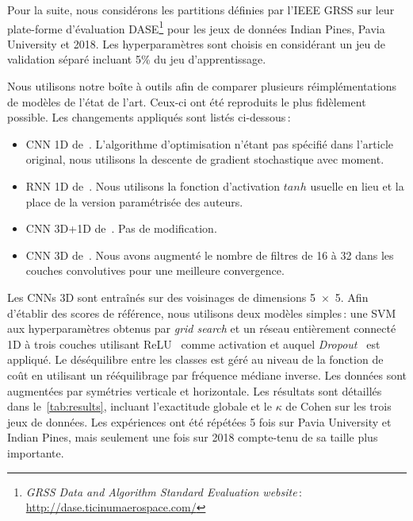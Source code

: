 Pour la suite, nous considérons les partitions définies par l'\gls{IEEE} \gls{GRSS} sur leur plate-forme d'évaluation DASE\footnote{\emph{GRSS Data and Algorithm Standard Evaluation website}\,: \url{http://dase.ticinumaerospace.com/}} pour les jeux de données Indian Pines, Pavia University et  2018. Les hyperparamètres sont choisis en considérant un jeu de validation séparé incluant 5\% du jeu d'apprentissage.

Nous utilisons notre boîte à outils afin de comparer plusieurs réimplémentations de modèles de l'état de l'art. Ceux-ci ont été reproduits le plus fidèlement possible. Les changements appliqués sont listés ci-dessous\,:
\begin{itemize}
	\item \gls{CNN} 1D de~\citet{hu_deep_2015}. L'algorithme d'optimisation n'étant pas spécifié dans l'article original, nous utilisons la descente de gradient stochastique avec moment.
    \item \gls{RNN} 1D de~\citet{mou_deep_2017}. Nous utilisons la fonction d'activation $tanh$ usuelle en lieu et la place de la version paramétrisée des auteurs.
    \item \gls{CNN} 3D+1D de~\citet{ben_hamida_deep_2016}. Pas de modification.
    \item \gls{CNN} 3D de~\citet{li_spectralspatial_2017}. Nous avons augmenté le nombre de filtres de 16 à 32 dans les couches convolutives pour une meilleure convergence.
\end{itemize}

Les \glspl{CNN} 3D sont entraînés sur des voisinages de dimensions \num{5x5}. Afin d'établir des scores de référence, nous utilisons deux modèles simples\,: une \gls{SVM} aux hyperparamètres obtenus par \emph{grid search} et un réseau entièrement connecté 1D à trois couches utilisant \gls{ReLU}~\cite{nair_rectified_2010} comme activation et auquel \emph{Dropout}~\cite{srivastava_dropout_2014} est appliqué. Le déséquilibre entre les classes est géré au niveau de la fonction de coût en utilisant un rééquilibrage par fréquence médiane inverse. Les données sont augmentées par symétries verticale et horizontale. Les résultats sont détaillés dans le~\cref{tab:results}, incluant l'exactitude globale et le $\kappa$ de Cohen sur les trois jeux de données. Les expériences ont été répétées 5 fois sur Pavia University et Indian Pines, mais seulement une fois sur  2018 compte-tenu de sa taille plus importante.

